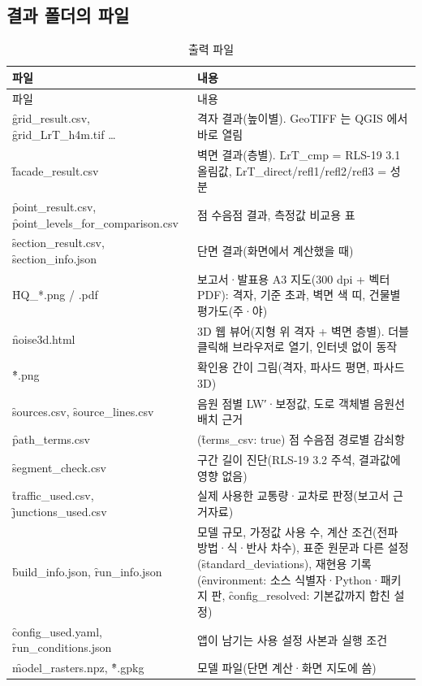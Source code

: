 \documentclass[10.5pt,a4paper]{article}
\begin{document}
\subsection{결과 폴더의 파일}
\begin{longtable}{P{57mm}P{95mm}}
\caption{출력 파일}\label{tab:out}\\
\toprule 파일 & 내용 \\ \midrule\endfirsthead
\toprule 파일 & 내용 \\ \midrule\endhead
\f{grid\_result.csv}, \f{grid\_LrT\_h4m.tif} … & 격자 결과(높이별). GeoTIFF 는 QGIS 에서 바로 열림 \\
\f{facade\_result.csv} & 벽면 결과(층별). \f{LrT\_cmp} = RLS-19 3.1 올림값, \f{LrT\_direct/refl1/refl2/refl3} = 성분 \\
\f{point\_result.csv}, \f{point\_levels\_for\_comparison.csv} & 점 수음점 결과, 측정값 비교용 표 \\
\f{section\_result.csv}, \f{section\_info.json} & 단면 결과(화면에서 계산했을 때) \\
\f{HQ\_*.png / .pdf} & 보고서·발표용 A3 지도(300 dpi + 벡터 PDF): 격자, 기준 초과, 벽면 색 띠, 건물별 평가도(주·야) \\
\f{noise3d.html} & 3D 웹 뷰어(지형 위 격자 + 벽면 층별). 더블클릭해 브라우저로 열기, 인터넷 없이 동작 \\
\f{*.png} & 확인용 간이 그림(격자, 파사드 평면, 파사드 3D) \\
\f{sources.csv}, \f{source\_lines.csv} & 음원 점별 LW′·보정값, 도로 객체별 음원선 배치 근거 \\
\f{path\_terms.csv} & (\f{terms\_csv: true}) 점 수음점 경로별 감쇠항 \\
\f{segment\_check.csv} & 구간 길이 진단(RLS-19 3.2 주석, 결과값에 영향 없음) \\
\f{traffic\_used.csv}, \f{junctions\_used.csv} & 실제 사용한 교통량·교차로 판정(보고서 근거자료) \\
\f{build\_info.json}, \f{run\_info.json} & 모델 규모, 가정값 사용 수, 계산 조건(전파 방법·식·반사 차수), 표준 원문과 다른 설정(\f{standard\_deviations}), 재현용 기록(\f{environment}: 소스 식별자·Python·패키지 판, \f{config\_resolved}: 기본값까지 합친 설정) \\
\f{config\_used.yaml}, \f{run\_conditions.json} & 앱이 남기는 사용 설정 사본과 실행 조건 \\
\f{model\_rasters.npz}, \f{*.gpkg} & 모델 파일(단면 계산·화면 지도에 씀) \\
\bottomrule
\end{longtable}
\end{document}
